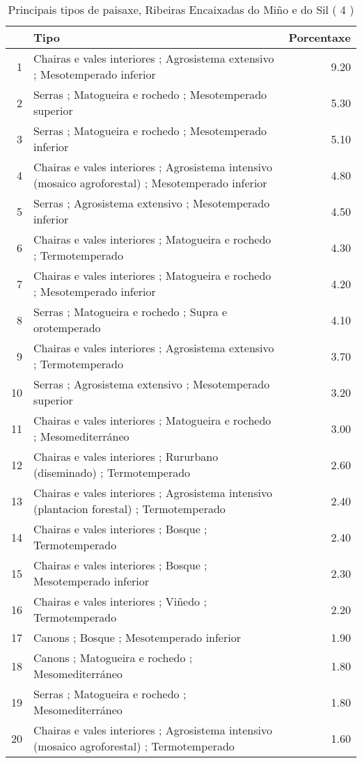 \begin{table}[p]
\centering
\caption{Principais tipos de paisaxe,  Ribeiras Encaixadas do Miño e do Sil ( 4 )} 
\label{Tipos 4}
\begin{tabular}{rlr}
  \hline
 & Tipo & Porcentaxe \\ 
  \hline
1 & Chairas e vales interiores ; Agrosistema extensivo ; Mesotemperado inferior & 9.20 \\ 
  2 & Serras ; Matogueira e rochedo ; Mesotemperado superior & 5.30 \\ 
  3 & Serras ; Matogueira e rochedo ; Mesotemperado inferior & 5.10 \\ 
  4 & Chairas e vales interiores ; Agrosistema intensivo (mosaico agroforestal) ; Mesotemperado inferior & 4.80 \\ 
  5 & Serras ; Agrosistema extensivo ; Mesotemperado inferior & 4.50 \\ 
  6 & Chairas e vales interiores ; Matogueira e rochedo ; Termotemperado & 4.30 \\ 
  7 & Chairas e vales interiores ; Matogueira e rochedo ; Mesotemperado inferior & 4.20 \\ 
  8 & Serras ; Matogueira e rochedo ; Supra e orotemperado & 4.10 \\ 
  9 & Chairas e vales interiores ; Agrosistema extensivo ; Termotemperado & 3.70 \\ 
  10 & Serras ; Agrosistema extensivo ; Mesotemperado superior & 3.20 \\ 
  11 & Chairas e vales interiores ; Matogueira e rochedo ; Mesomediterráneo & 3.00 \\ 
  12 & Chairas e vales interiores ; Rururbano (diseminado) ; Termotemperado & 2.60 \\ 
  13 & Chairas e vales interiores ; Agrosistema intensivo (plantacion forestal) ; Termotemperado & 2.40 \\ 
  14 & Chairas e vales interiores ; Bosque ; Termotemperado & 2.40 \\ 
  15 & Chairas e vales interiores ; Bosque ; Mesotemperado inferior & 2.30 \\ 
  16 & Chairas e vales interiores ; Viñedo ; Termotemperado & 2.20 \\ 
  17 & Canons ; Bosque ; Mesotemperado inferior & 1.90 \\ 
  18 & Canons ; Matogueira e rochedo ; Mesomediterráneo & 1.80 \\ 
  19 & Serras ; Matogueira e rochedo ; Mesomediterráneo & 1.80 \\ 
  20 & Chairas e vales interiores ; Agrosistema intensivo (mosaico agroforestal) ; Termotemperado & 1.60 \\ 

\end{tabular}
\end{table}
